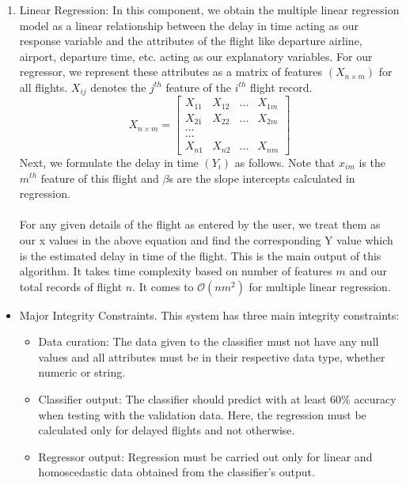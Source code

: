 \begin{itemize}
\begin{enumerate}
\item{Linear Regression:}
In this component, we obtain the multiple linear regression model as a linear relationship between the delay in time acting as our response variable and the attributes of the flight like departure airline, airport, departure time, etc. acting as our explanatory variables. For our regressor, we represent these attributes as a matrix of features $(X_{n\times m})$ for all flights. $X_{ij}$ denotes the $j^{th}$ feature of the $i^{th}$ flight record.
\[
X_{n\times m} =
\begin{bmatrix}

X_{11} & X_{12} & ... & X_{1m} \\
X_{21} & X_{22} & ... & X_{2m} \\
... \\
... \\
X_{n1} & X_{n2} & ... & X_{nm}
\end{bmatrix}
\]
Next, we formulate the delay in time $(Y_i)$ as follows. Note that $x_{im}$ is the $m^{th}$ feature of this flight and $\beta$s are the slope intercepts calculated in regression.\vspace{0.1cm}
\\
\vspace{0.1cm}
\\For any given details of the flight as entered by the user, we treat them as our x values in the above equation and find the corresponding Y value which is the estimated delay in time of the flight. This is the main output of this algorithm. It takes time complexity based on number of features $m$ and our total records of flight $n$. It comes to $\mathcal{O}(nm^2)$ for multiple linear regression.

\end{enumerate}
\end{itemize}

\begin{itemize} 
\item{ Major Integrity Constraints.}
This system has three main integrity constraints:\begin{itemize} 
\item{Data curation: }
The data given to the classifier must not have any null values and all attributes must be in their respective data type, whether numeric or string. 
\item{Classifier output: }
The classifier should predict with at least 60\% accuracy when testing with the validation data. Here, the regression must be calculated only for delayed flights and not otherwise.
\item{Regressor output: }
Regression must be carried out only for linear and homoscedastic data obtained from the classifier's output.
\end{itemize}
\end{itemize}